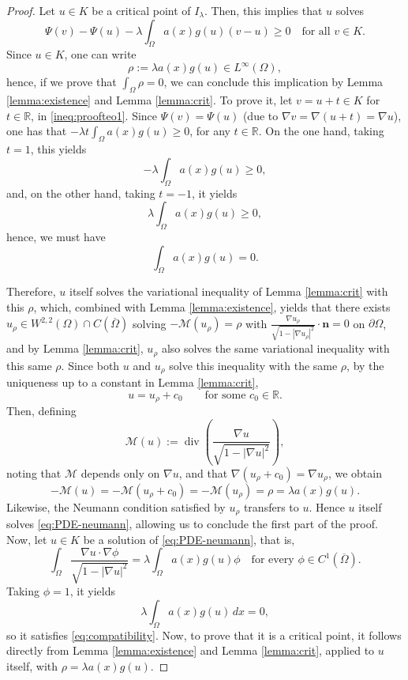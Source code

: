\documentclass[11pt,reqno]{amsart}
\theoremstyle{plain}
\theoremstyle{definition}
\numberwithin{equation}{section}
\newcommand{\R}{\mathbb{R}}
\begin{document}
\begin{proof}
    Let $u \in K$ be a critical point of $I_\lambda$. Then, this implies that $u$ solves
    \begin{equation} \label{ineq:proofteo1}
    \Psi(v) - \Psi(u) - \lambda \int_\Omega a(x)g(u) (v-u) \geq 0 \quad \text{for all } v\in K. \end{equation}
    Since $u \in K$, one can write
    $$\rho := \lambda a(x)g(u) \in L^\infty(\Omega),$$
    hence, if we prove that $\int_\Omega \rho = 0$, we can conclude this implication by Lemma \ref{lemma:existence} and Lemma \ref{lemma:crit}. To prove it, let $v = u+t \in K$ for $t \in \R$, in \eqref{ineq:proofteo1}. Since $\Psi(v) = \Psi(u)$ (due to $\nabla v = \nabla (u+t) = \nabla u$), one has that
    $-\lambda t \int_\Omega a(x)g(u) \geq 0$,
    for any $t \in \R$. On the one hand, taking $t=1$, this yields
    $$-\lambda \int_\Omega a(x)g(u) \geq 0,$$
    and, on the other hand, taking $t = -1$, it yields
    $$\lambda \int_\Omega a(x)g(u) \geq 0,$$
    hence, we must have
    $$\int_\Omega a(x) g(u) = 0.$$

    Therefore, $u$ itself solves the variational inequality of Lemma \ref{lemma:crit} with this $\rho$, which, combined with Lemma \ref{lemma:existence}, yields that there exists $u_\rho\in W^{2,2}(\Omega)\cap C(\overline\Omega)$ solving $-\mathcal M(u_\rho)=\rho$ with $\frac{\nabla u_\rho}{\sqrt{1-|\nabla u_\rho|^2}} \cdot \mathbf n=0$ on $\partial\Omega$, and by Lemma \ref{lemma:crit}, $u_\rho$ also solves the same variational inequality with this same $\rho$. Since both $u$ and $u_\rho$ solve this inequality with the same $\rho$, by the uniqueness up to a constant in  Lemma \ref{lemma:crit},
    $$u = u_\rho + c_0 \qquad \text{for some } c_0 \in \R.$$
    Then, defining
    $$\mathcal{M}(u) := \operatorname{div}\left( \frac{\nabla u}{\sqrt{1-|\nabla u|^2}} \right),$$ noting that $\mathcal M$ depends only on $\nabla u$, and that $\nabla(u_\rho+c_0)=\nabla u_\rho$, we obtain
    $$-\mathcal M(u) = -\mathcal M(u_\rho+c_0) = -\mathcal M(u_\rho) = \rho = \lambda a(x) g(u).$$
    Likewise, the Neumann condition satisfied by $u_\rho$ transfers to $u$. Hence $u$ itself solves \eqref{eq:PDE-neumann}, allowing us to conclude the first part of the proof.
    \medskip
    Now, let $u\in K$ be a solution of \eqref{eq:PDE-neumann}, that is,
    $$\int_\Omega \frac{\nabla u \cdot \nabla \phi}{\sqrt{1-|\nabla u|^2}}  = \lambda \int_\Omega a(x) g(u) \phi \quad \text{for every } \phi \in C^1(\overline{\Omega}).$$
    Taking $\phi = 1$, it yields
    $$\lambda \int_\Omega a(x) g(u) \, dx = 0,$$
    so it satisfies \eqref{eq:compatibility}. Now, to prove that it is a critical point, it follows directly from Lemma \ref{lemma:existence} and Lemma \ref{lemma:crit}, applied to $u$ itself, with $\rho = \lambda a(x) g(u)$.


\end{proof}
\end{document}
